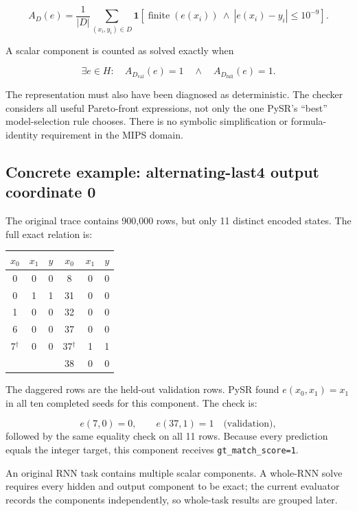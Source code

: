 \documentclass[10pt]{article}
\begin{document}
\[
  A_D(e)=\frac{1}{|D|}\sum_{(x_i,y_i)\in D}
  \mathbf{1}\!\left[\operatorname{finite}(e(x_i))\ \wedge\
  |e(x_i)-y_i|\le 10^{-9}\right].
\]

A scalar component is counted as solved exactly when

\[
  \exists e\in H:\quad A_{D_{\mathrm{val}}}(e)=1
  \quad\wedge\quad A_{D_{\mathrm{full}}}(e)=1.
\]

The representation must also have been diagnosed as deterministic.  The
checker considers all useful Pareto-front expressions, not only the one PySR's
``best'' model-selection rule chooses.  There is no symbolic simplification or
formula-identity requirement in the MIPS domain.

\subsection*{Concrete example: alternating-last4 output coordinate 0}

The original trace contains 900,000 rows, but only 11 distinct encoded states.
The full exact relation is:

\begin{center}
\begin{tabular}{ccc@{\qquad}ccc}
\toprule
$x_0$ & $x_1$ & $y$ & $x_0$ & $x_1$ & $y$\\
\midrule
0  & 0 & 0 & 8  & 0 & 0\\
0  & 1 & 1 & 31 & 0 & 0\\
1  & 0 & 0 & 32 & 0 & 0\\
6  & 0 & 0 & 37 & 0 & 0\\
7$^{\dagger}$ & 0 & 0 & 37$^{\dagger}$ & 1 & 1\\
 & & & 38 & 0 & 0\\
\bottomrule
\end{tabular}
\end{center}

The daggered rows are the held-out validation rows.  PySR found
$e(x_0,x_1)=x_1$ in all ten completed seeds for this component.  The check is:

\[
  e(7,0)=0,\qquad e(37,1)=1
  \quad\text{(validation)},
\]
followed by the same equality check on all 11 rows.  Because every prediction
equals the integer target, this component receives \texttt{gt\_match\_score=1}.

An original RNN task contains multiple scalar components.  A whole-RNN solve
requires every hidden and output component to be exact; the current evaluator
records the components independently, so whole-task results are grouped later.
\end{document}
